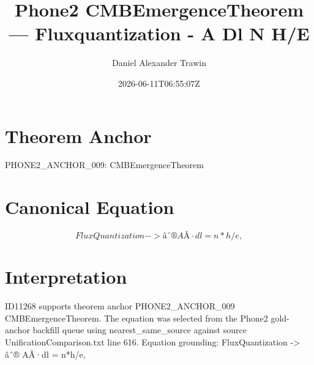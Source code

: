 \documentclass[11pt]{article}
\title{Phone2 CMBEmergenceTheorem — Fluxquantization - A Dl N H/E}
\author{Daniel Alexander Trawin}
\date{2026-06-11T06:55:07Z}
\begin{document}
\maketitle
\section*{Theorem Anchor}
PHONE2_ANCHOR_009: CMBEmergenceTheorem
\section*{Canonical Equation}
\[
FluxQuantization -> âˆ® AÂ·dl = n*h/e,
\]
\section*{Interpretation}
ID11268 supports theorem anchor PHONE2_ANCHOR_009 CMBEmergenceTheorem. The equation was selected from the Phone2 gold-anchor backfill queue using nearest_same_source against source UnificationComparison.txt line 616. Equation grounding: FluxQuantization -> âˆ® AÂ·dl = n*h/e,
\end{document}
